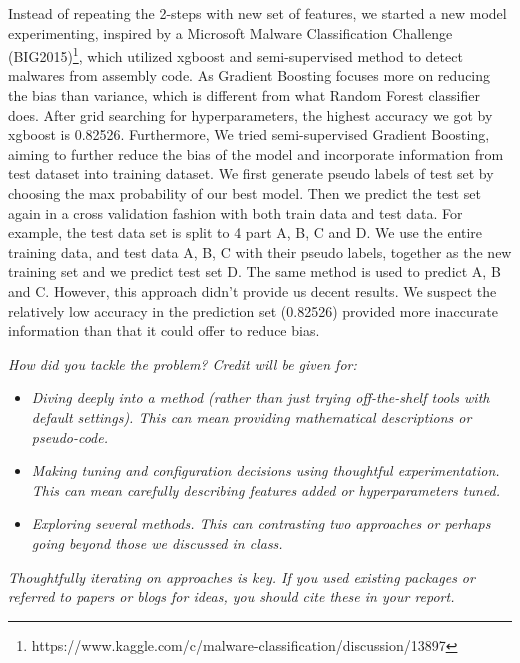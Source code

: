 \documentclass[11pt]{article}
\begin{document}
\begin{enumerate}
Instead of repeating the 2-steps with new set of features, we started a new model experimenting, inspired by a Microsoft Malware Classification Challenge (BIG2015)\footnote{https://www.kaggle.com/c/malware-classification/discussion/13897}, which utilized xgboost and semi-supervised method to detect malwares from assembly code. As Gradient Boosting focuses more on reducing the bias than variance, which is different from what Random Forest classifier does. After grid searching for hyperparameters, the highest accuracy we got by xgboost is 0.82526. Furthermore, We tried semi-supervised Gradient Boosting, aiming to further reduce the bias of the model and incorporate information from test dataset into training dataset. We first generate pseudo labels of test set by choosing the max probability of our best model. Then we predict the test set again in a cross validation fashion with both train data and test data.
For example, the test data set is split to 4 part A, B, C and D. We use the entire training data, and test data A, B, C with their pseudo labels, together as the new training set and we predict test set D. The same method is used to predict A, B and C. However, this approach didn't provide us decent results. We suspect the relatively low accuracy in the prediction set (0.82526) provided more inaccurate information than that it could offer to reduce bias. 
\end{enumerate}

\textit{How did you tackle the problem? Credit will be given for:}

  \begin{itemize}
  \item \textit{Diving deeply into a method (rather than just trying
    off-the-shelf tools with default settings). This can mean 
    providing mathematical descriptions or pseudo-code.}
  \item \textit{Making tuning and configuration decisions using thoughtful experimentation.  
    This can mean carefully describing features added or hyperparameters tuned.}
  \item \textit{Exploring several methods. This can contrasting two approaches
    or perhaps going beyond those we discussed in class.}
  \end{itemize}

  \noindent \textit{Thoughtfully iterating on approaches is key.
  If you used existing packages or referred to papers or blogs for ideas,
  you should cite these in your report. }
\end{document}
